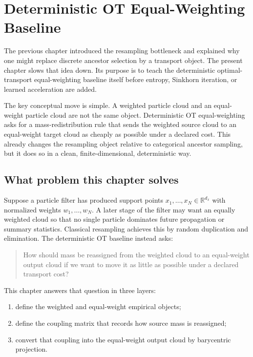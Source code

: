 \chapter{Deterministic OT Equal-Weighting Baseline}
\label{ch:bf-dpf-ot-baseline}

The previous chapter introduced the resampling bottleneck and explained why one
might replace discrete ancestor selection by a transport object.  The present
chapter slows that idea down.  Its purpose is to teach the deterministic optimal-
transport equal-weighting baseline itself before entropy, Sinkhorn iteration, or
learned acceleration are added.

The key conceptual move is simple.  A weighted particle cloud and an equal-weight
particle cloud are not the same object.  Deterministic OT equal-weighting asks for
a mass-redistribution rule that sends the weighted source cloud to an equal-weight
target cloud as cheaply as possible under a declared cost.  This already changes
the resampling object relative to categorical ancestor sampling, but it does so in
a clean, finite-dimensional, deterministic way.

\section{What problem this chapter solves}
\label{sec:bf-ot-baseline-problem}

Suppose a particle filter has produced support points
\(x_1,\ldots,x_N\in\mathbb R^{d_x}\) with normalized weights
\(w_1,\ldots,w_N\).  A later stage of the filter may want an equally weighted
cloud so that no single particle dominates future propagation or summary
statistics.  Classical resampling achieves this by random duplication and
elimination.  The deterministic OT baseline instead asks:

\begin{quote}
How should mass be reassigned from the weighted cloud to an equal-weight output
cloud if we want to move it as little as possible under a declared transport
cost?
\end{quote}

This chapter answers that question in three layers:
\begin{enumerate}[label=(\roman*)]
  \item define the weighted and equal-weight empirical objects;
  \item define the coupling matrix that records how source mass is reassigned;
  \item convert that coupling into the equal-weight output cloud by barycentric
  projection.
\end{enumerate}

